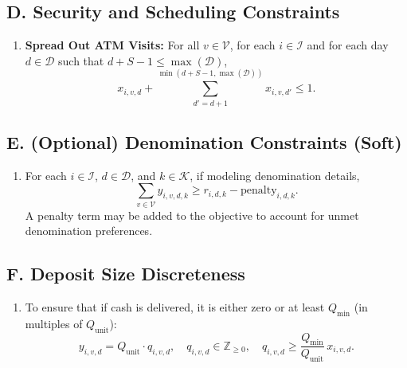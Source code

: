 \documentclass[11pt]{article}
\begin{document}
\subsection*{D. Security and Scheduling Constraints}
\begin{enumerate}[label=\textbf{(D\arabic*)}]
    \item \textbf{Spread Out ATM Visits:} For all \(v \in \mathcal{V}\), for each \(i \in \mathcal{I}\) and for each day \(d \in \mathcal{D}\) such that \(d+S-1 \le \max(\mathcal{D})\),
    \[
    x_{i,v,d} + \sum_{d' = d+1}^{\min(d+S-1,\max(\mathcal{D}))} x_{i,v,d'} \le 1.
    \]
\end{enumerate}

\subsection*{E. (Optional) Denomination Constraints (Soft)}
\begin{enumerate}[label=\textbf{(E\arabic*)}]
    \item For each \(i \in \mathcal{I}\), \(d \in \mathcal{D}\), and \(k \in \mathcal{K}\), if modeling denomination details,
    \[
    \sum_{v \in \mathcal{V}} y_{i,v,d,k} \ge r_{i,d,k} - \text{penalty}_{i,d,k}.
    \]
    A penalty term may be added to the objective to account for unmet denomination preferences.
\end{enumerate}

\subsection*{F. Deposit Size Discreteness}
\begin{enumerate}[label=\textbf{(F\arabic*)}]
    \item To ensure that if cash is delivered, it is either zero or at least \(Q_{\min}\) (in multiples of \(Q_{\text{unit}}\)):
    \[
    y_{i,v,d} = Q_{\text{unit}} \cdot q_{i,v,d}, \quad q_{i,v,d} \in \mathbb{Z}_{\geq 0}, \quad q_{i,v,d} \ge \frac{Q_{\min}}{Q_{\text{unit}}}\, x_{i,v,d}.
    \]
\end{enumerate}
\end{document}
